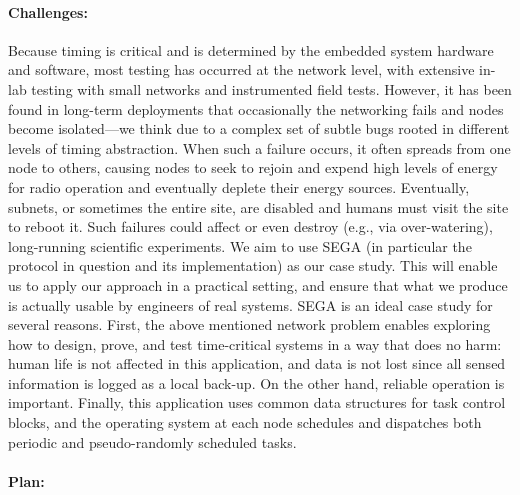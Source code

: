 \paragraph{Challenges:}

Because timing is critical and is determined by the embedded system hardware and software, most testing has occurred at the network level, with extensive in-lab testing with small networks and instrumented field tests.
However, it has been found in long-term deployments %
that occasionally the networking fails and nodes become isolated---we think due to a complex set of subtle bugs rooted in different levels of timing abstraction.
When such a failure occurs, it often spreads from one node to others, causing nodes to seek to rejoin and expend high levels of energy for radio operation and eventually deplete their energy sources.
Eventually, subnets, or sometimes the entire site, are disabled and humans must visit the site to reboot it.
Such failures could %
affect %
or even destroy (e.g., via over-watering), long-running scientific experiments.
%
We aim to use SEGA (in particular the protocol in question and its implementation) as our case study.
This will enable us to apply our approach in a practical setting, and ensure that what we produce is actually usable by engineers of real systems.
%
SEGA is an ideal case study for several reasons.
First, the above mentioned network problem enables exploring how to design, prove, and test time-critical systems in a way that does no harm: human life is not affected in this application, and data is not lost since all sensed information is logged as a local back-up.
On the other hand, reliable operation is important. %
Finally, this application uses common data structures for task control blocks, and the operating system at each node schedules and dispatches both periodic and pseudo-randomly scheduled tasks.



\paragraph{Plan:}

